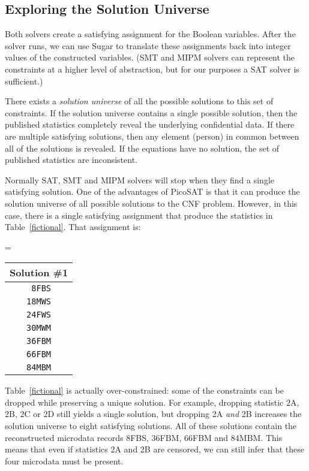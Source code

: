 \documentclass[runningheads]{llncs}
\begin{document}
\subsection{Exploring the Solution Universe}

Both solvers create a satisfying assignment for the \NumVariables{}
Boolean variables. After the solver runs, we can use Sugar to translate
these assignments back into integer values of the constructed
variables. (SMT and MIPM solvers can represent the constraints at a higher
level of abstraction, but for our purposes a SAT solver is
sufficient.)

There exists a \textit{solution universe} of all the possible
solutions to this set of constraints. If the solution
universe contains a single possible solution, then the published
statistics completely reveal the underlying confidential data. If
there are multiple satisfying solutions, then any element (person) in
common between all of the solutions is revealed. If the equations have
no solution, the set of published statistics are inconsistent.

Normally SAT, SMT and MIPM solvers will stop when they find a single
satisfying solution. One of the advantages of PicoSAT is that it can
produce the solution universe of all possible solutions to the CNF
problem. However, in this case, there is a single satisfying
assignment that produce the statistics in
Table~\ref{fictional}. That assignment is:

\begin{center}
\begin{minipage}{1.5in}
  
\end{minipage}
\begin{minipage}{.5in}
  =
\end{minipage}
\begin{minipage}{1.5in}
\begin{tabular}{c}
  Solution \#1\\
  \hline
\texttt{ 8FBS}\\
\texttt{18MWS}\\
\texttt{24FWS}\\
\texttt{30MWM}\\
\texttt{36FBM}\\
\texttt{66FBM}\\
\texttt{84MBM}\\
\end{tabular}
\end{minipage}
\end{center}  
Table~\ref{fictional} is actually over-constrained: some of the
constraints can be dropped while preserving a unique
solution. For example, dropping statistic 2A, 2B, 2C or 2D still yields a
single solution, but dropping 2A \emph{and} 2B increases the solution universe to
eight satisfying solutions. All of these solutions contain the
reconstructed microdata records 8FBS, 36FBM, 66FBM and 84MBM. This
means that even if statistics 2A and 2B are censored, we can still
infer that these four microdata must be present.
\end{document}
